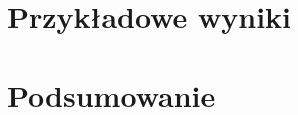 \documentclass[12pt, twoside, a4paper, openright]{report}
\begin{document}
\chapter{Przykładowe wyniki}


\chapter{Podsumowanie} \label{ch:summary}


\begin{appendices}

\end{appendices}

\newpage

\listoffigures
\listoftables
\listoflistings

\nocite{*}


\end{document}
